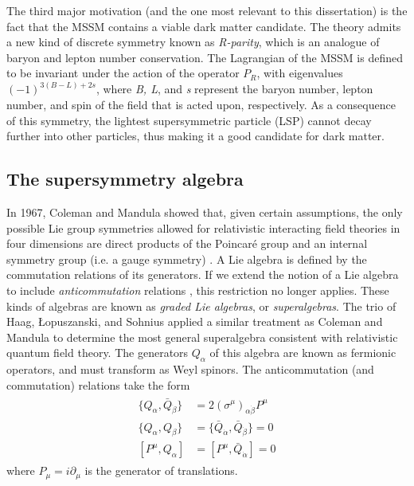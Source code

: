 The third major motivation (and the one most relevant to this dissertation) is the fact that the MSSM contains a viable dark matter candidate. The theory admits a new kind of discrete symmetry known as \emph{R-parity}, which is an analogue of baryon and lepton number conservation. The Lagrangian of the MSSM is defined to be invariant under the action of the operator $P_R$, with eigenvalues $(-1)^{3(B-L)+2s}$, where \emph{B, L}, and \emph{s} represent the baryon number, lepton number, and spin of the field that is acted upon, respectively. As a consequence of this symmetry, the lightest supersymmetric particle (LSP) cannot decay further into other particles, thus making it a good candidate for dark matter.

\subsection{The supersymmetry algebra}
In 1967, Coleman and Mandula \citep{Coleman:1967ad} showed that, given certain assumptions, the only possible Lie group symmetries allowed for relativistic interacting field theories in four dimensions are direct products of the Poincar\'e group and an internal symmetry group (i.e. a gauge symmetry) \citep{Mandula:2015}.
A Lie algebra is defined by the commutation relations of its generators. If we extend the notion of a Lie algebra to include \emph{anticommutation} relations \citep{Wess:1974tw}, this restriction no longer applies. These kinds of algebras are known as \emph{graded Lie algebras}, or \emph{superalgebras}. The trio of Haag, Łopuszanski, and Sohnius \citep{Haag:1974qh} applied a similar treatment as Coleman and Mandula to determine the most general superalgebra consistent with relativistic quantum field theory. The generators $Q_\alpha$ of this algebra are known as fermionic operators, and must transform as Weyl spinors. The anticommutation (and commutation) relations take the form
\begin{align}
  \begin{split}
  \{Q_\alpha, \bar{Q}_{\dot{\beta}}\} &= 2(\sigma^\mu)_{\alpha\dot{\beta}}P^\mu\\
  \{Q_\alpha, Q_\beta\} &= \{\bar{Q}_{\dot{\alpha}}, \bar{Q}_{\dot{\beta}}\} = 0\\
  [P^\mu,Q_\alpha] &= [P^\mu,\bar{Q}_{\dot{\alpha}}] = 0
\end{split}
\label{eq:susy_algebra}
\end{align}
where $P_\mu = i\partial_\mu$ is the generator of translations. 

